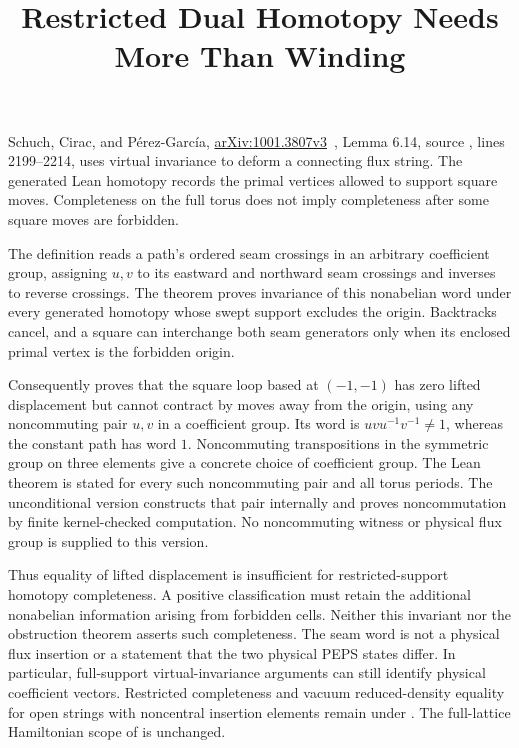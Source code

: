 \documentclass{article}
\title{Restricted Dual Homotopy Needs More Than Winding}
\author{}
\date{}
\begin{document}
\maketitle
{}

Schuch, Cirac, and P\'erez-Garc\'ia,
\href{https://arxiv.org/abs/1001.3807v3}{arXiv:1001.3807v3}~\cite{Schuch2010PEPS},
Lemma 6.14, source , lines 2199--2214,
uses virtual invariance to deform a connecting flux string. The generated
Lean homotopy records the primal vertices allowed to support square moves.
Completeness on the full torus does not imply completeness after some
square moves are forbidden.

The definition  reads a path's ordered
seam crossings in an arbitrary coefficient group, assigning $u,v$ to its eastward
and northward seam crossings and inverses to reverse crossings.
The theorem
proves invariance of this nonabelian word under every generated homotopy
whose swept support excludes the origin. Backtracks cancel, and a square
can interchange both seam generators only when its enclosed primal vertex
is the forbidden origin.

Consequently
proves that the square loop based at $(-1,-1)$ has zero lifted displacement
but cannot contract by moves away from the origin, using any noncommuting
pair $u,v$ in a coefficient group. Its word is $uvu^{-1}v^{-1}\ne1$, whereas the
constant path has word $1$. Noncommuting transpositions in the symmetric
group on three elements give a concrete choice of coefficient group. The Lean
theorem is stated for every such noncommuting pair and all torus periods.
The unconditional version
constructs that pair internally and proves noncommutation by finite
kernel-checked computation. No noncommuting witness or physical flux group
is supplied to this version.

Thus equality of lifted displacement is insufficient for restricted-support
homotopy completeness. A positive classification must retain the additional
nonabelian information arising from forbidden cells. Neither this invariant
nor the obstruction theorem asserts such completeness. The seam word is
not a physical flux insertion or a statement that the two physical PEPS
states differ. In particular, full-support virtual-invariance arguments
can still identify physical coefficient vectors. Restricted completeness
and vacuum reduced-density equality for open strings with noncentral insertion elements remain under .
The full-lattice Hamiltonian scope of  is unchanged.


\end{document}
